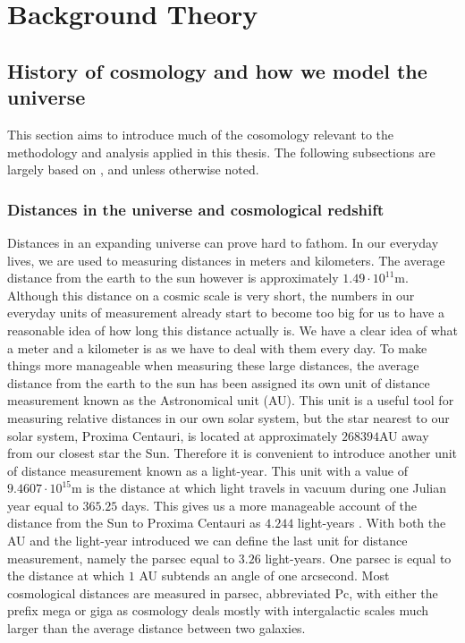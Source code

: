 \chapter{Background Theory}\label{sec:backgroundtheory}
\section{History of cosmology and how we model the universe}
This section aims to introduce much of the cosomology relevant to the methodology and analysis applied in this thesis.
The following subsections are largely based on \cite[ch.7]{schneider2006extragalactic}, \cite[ch.2]{Dodelson:1282338} and \cite{ryden2017introduction} unless otherwise noted.
\subsection{Distances in the universe and cosmological redshift}\label{sec:sec_distance}
Distances in an expanding universe can prove hard to fathom. In our everyday
lives, we are used to measuring distances in meters and kilometers. The
average distance from the earth to the sun however is approximately $1.49\cdot10^{11}$m.
Although this distance on a cosmic scale is very short, the numbers in our
everyday units of measurement already start to become too big for us to have a
reasonable idea of how long this distance actually is. We have a clear idea of
what a meter and a kilometer is as we have to deal with them every day. To make
things more manageable when measuring these large distances, the average distance
from the earth to the sun has been assigned its own unit of distance measurement known as the
Astronomical unit (AU). This unit is a useful tool for measuring relative
distances in our own solar system, but the star nearest to our solar system, Proxima Centauri, is
located at approximately $268394$AU away from our closest star the Sun.
Therefore it is convenient to introduce another unit of distance measurement known as a light-year. This unit with a value of $9.4607\cdot10^{15}$m is the distance at
which light travels in vacuum during one Julian year equal to $365.25$ days.
This gives us a more manageable account of the distance from the Sun to Proxima
Centauri as $4.244$ light-years \cite{Brown2020GaiaED}. With both the AU and the light-year introduced
we can define the last unit for distance measurement, namely the parsec equal to $3.26$
light-years. One parsec is equal to the distance at which $1$ AU subtends an angle
of one arcsecond. Most
cosmological distances are measured in parsec, abbreviated Pc, with either the
prefix mega or giga as cosmology deals mostly with intergalactic scales much
larger than the average distance between two galaxies.\\

